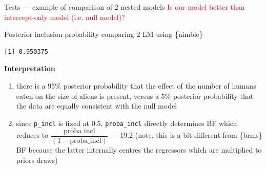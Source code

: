\documentclass[
  10pt,
  ignorenonframetext,
  aspectratio=169,
  t]{beamer}
\newenvironment{Shaded}{\begin{snugshade}}{\end{snugshade}}
\newcommand{\AttributeTok}[1]{\textcolor[rgb]{0.40,0.45,0.13}{#1}}
\newcommand{\CommentTok}[1]{\textcolor[rgb]{0.37,0.37,0.37}{#1}}
\newcommand{\ConstantTok}[1]{\textcolor[rgb]{0.56,0.35,0.01}{#1}}
\newcommand{\DecValTok}[1]{\textcolor[rgb]{0.68,0.00,0.00}{#1}}
\newcommand{\FunctionTok}[1]{\textcolor[rgb]{0.28,0.35,0.67}{#1}}
\newcommand{\NormalTok}[1]{\textcolor[rgb]{0.00,0.23,0.31}{#1}}
\newcommand{\OtherTok}[1]{\textcolor[rgb]{0.00,0.23,0.31}{#1}}
\newcommand{\SpecialCharTok}[1]{\textcolor[rgb]{0.37,0.37,0.37}{#1}}
\newcommand{\StringTok}[1]{\textcolor[rgb]{0.13,0.47,0.30}{#1}}
\providecommand{\tightlist}{%
  \setlength{\itemsep}{0pt}\setlength{\parskip}{0pt}}
\newcommand{\bluebold}[1]{\textcolor{bluebeamer}{\textbf{#1}}}
\let\oldtexttt\texttt
\renewcommand{\texttt}[1]{\colorbox{gray!20}{\oldtexttt{#1}}}
\begin{document}
\begin{frame}[fragile]{Tests --- example of comparison of 2 nested
models}
\protect{}\label{tests-example-of-comparison-of-2-nested-models-4}
\textcolor{red}{Is our model better than intercept-only model (i.e. null model)?}

Posterior inclusion probability comparing 2 LM using \{nimble\}

\scriptsize

\begin{Shaded}
\end{Shaded}

\begin{verbatim}
[1] 0.950375
\end{verbatim}

\normalsize

\pause

\bluebold{Interpretation}

\scriptsize

\begin{enumerate}
\tightlist
\item
  there is a 95\% posterior probability that the effect of the number of
  humans eaten on the size of aliens is present, versus a 5\% posterior
  probability that the data are equally consistent with the null model
\item
  since \texttt{p\_incl} is fixed at 0.5, \texttt{proba\_incl} directly
  determines BF which reduces to
  \(\dfrac{\text{proba\_incl}}{(1-\text{proba\_incl})}=\) 19.2 (note,
  this is a bit different from \{brms\} BF because the latter internally
  centres the regressors which are multiplied to priors draws)
\end{enumerate}
\end{frame}
\end{document}
